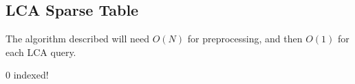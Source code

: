 \subsection{LCA Sparse Table}

The algorithm described will need $O(N)$ for preprocessing, and then $O(1)$ for each LCA query.

{\color{red} 0 indexed!}

